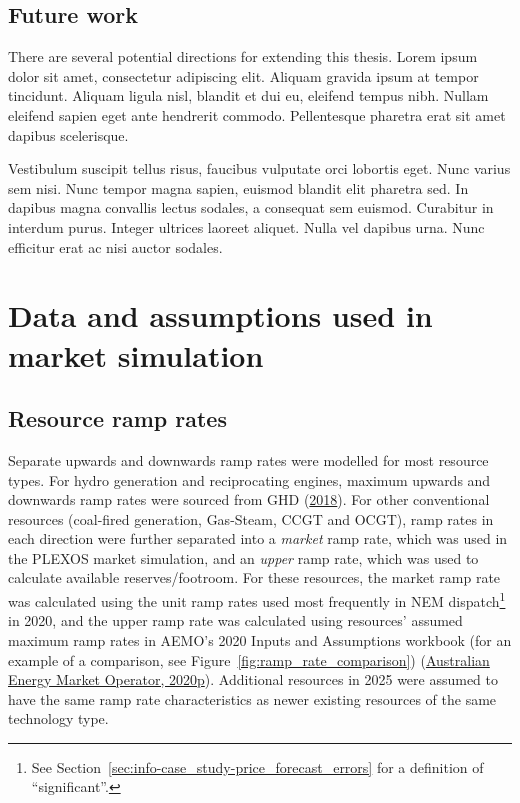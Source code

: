 \documentclass[12pt,a4paper,]{report}
\begin{document}
\hypertarget{future-work}{%
\section{Future work}\label{future-work}}

There are several potential directions for extending this thesis. Lorem
ipsum dolor sit amet, consectetur adipiscing elit. Aliquam gravida ipsum
at tempor tincidunt. Aliquam ligula nisl, blandit et dui eu, eleifend
tempus nibh. Nullam eleifend sapien eget ante hendrerit commodo.
Pellentesque pharetra erat sit amet dapibus scelerisque.

Vestibulum suscipit tellus risus, faucibus vulputate orci lobortis eget.
Nunc varius sem nisi. Nunc tempor magna sapien, euismod blandit elit
pharetra sed. In dapibus magna convallis lectus sodales, a consequat sem
euismod. Curabitur in interdum purus. Integer ultrices laoreet aliquet.
Nulla vel dapibus urna. Nunc efficitur erat ac nisi auctor sodales.

\appendix
\renewcommand\thefigure{\thesection.\arabic{figure}}
\renewcommand\thetable{\thesection.\arabic{table}}

\hypertarget{sec:appendix-reserves_assumptions}{%
\chapter{Data and assumptions used in market
simulation}\label{sec:appendix-reserves_assumptions}}

\hypertarget{resource-ramp-rates}{%
\section{Resource ramp rates}\label{resource-ramp-rates}}

Separate upwards and downwards ramp rates were modelled for most
resource types. For hydro generation and reciprocating engines, maximum
upwards and downwards ramp rates were sourced from GHD
(\protect\hyperlink{ref-ghd2018AEMOCost2018}{2018}). For other
conventional resources (coal-fired generation, Gas-Steam, CCGT and
OCGT), ramp rates in each direction were further separated into a
\emph{market} ramp rate, which was used in the PLEXOS market simulation,
and an \emph{upper} ramp rate, which was used to calculate available
reserves/footroom. For these resources, the market ramp rate was
calculated using the unit ramp rates used most frequently in NEM
dispatch\footnote{See
  Section~\ref{sec:info-case_study-price_forecast_errors} for a
  definition of ``significant''.} in 2020, and the upper ramp rate was
calculated using resources' assumed maximum ramp rates in AEMO's 2020
Inputs and Assumptions workbook (for an example of a comparison, see
Figure~\ref{fig:ramp_rate_comparison})
(\protect\hyperlink{ref-australianenergymarketoperator2020InputsAssumptions2020}{Australian
Energy Market Operator, 2020p}). Additional resources in 2025 were
assumed to have the same ramp rate characteristics as newer existing
resources of the same technology type.
\end{document}
